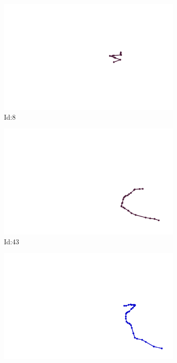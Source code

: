 \documentclass[12pt,twoside]{report}
\begin{document}
\begin{figure}
\centering
\begin{subfigure}[b]{0.20\textwidth}
\centering
\includegraphics[width=\textwidth]{../trajectories/8.png}
\caption{Id:8}
\end{subfigure}
\begin{subfigure}[b]{0.20\textwidth}
\centering
\includegraphics[width=\textwidth]{../trajectories/43.png}
\caption{Id:43}
\end{subfigure}
\begin{subfigure}[b]{0.20\textwidth}
\centering
\includegraphics[width=\textwidth]{../trajectories/95.png}

\end{subfigure}
\end{figure}
\end{document}
